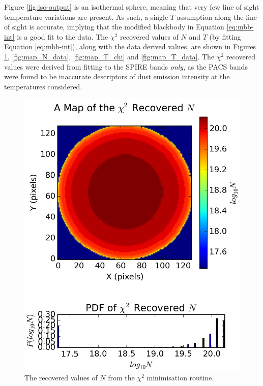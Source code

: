 \documentclass{report}
\begin{document}
Figure \ref{fig:iso-output} is an isothermal sphere, meaning that very few line of sight temperature variations are present. As such, a single $T$ assumption along the line of sight is accurate, implying that the modified blackbody in Equation \ref{eq:mbb-int} is a good fit to the data. The $\chi^{2}$ recovered values of $N$ and $T$ (by fitting Equation \ref{eq:mbb-int}), along with the data derived values, are shown in Figures \ref{fig:map_N_chi}, \ref{fig:map_N_data},
\ref{fig:map_T_chi} and \ref{fig:map_T_data}. The $\chi^{2}$ recovered values were derived from fitting to the SPIRE bands \textit{only}, as the PACS bands were found to be inaccurate descriptors of dust emission intensity at the temperatures considered.

\begin{figure}[H]
  \captionsetup{width=0.2\textwidth}
  \begin{minipage}[b]{0.25\linewidth}
    \centering
    \includegraphics[width=\linewidth]{../img/sim/map_N_chi.png}
    \caption{\protect The recovered values of $N$ from the $\chi^{2}$ minimisation routine.}\label{fig:map_N_chi}

\end{minipage}
\end{figure}
\end{document}
